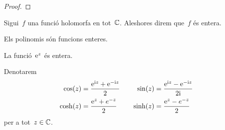 \documentclass[../Apunts.tex]{subfiles}
\begin{document}
	\begin{proof}
%		
	\end{proof}
	\begin{definition}
		\label{def:funció entera}
		Sigui~\(f\) una funció holomorfa en tot~\(\mathbb{C}\). Aleshores direm que~\(f\) és entera.
	\end{definition}
	\begin{example}
		Els polinomis són funcions enteres.
	\end{example}
	\begin{example}
		La funció~\(\mathrm{e}^{z}\) és entera.
	\end{example}
	\begin{notation}
		Denotarem
		\begin{gather*}
			\begin{split}
				\cos(z)&=\frac{\mathrm{e}^{\mathrm{i} z}+\mathrm{e}^{-\mathrm{i} z}}{2} \\
				\cosh(z)&=\frac{\mathrm{e}^{z}+e^{-z}}{2}
			\end{split}\qquad
			\begin{split}
				\sin(z)&=\frac{\mathrm{e}^{\mathrm{i} z}-\mathrm{e}^{-\mathrm{i} z}}{2\mathrm{i}} \\
				\sinh(z)&=\frac{\mathrm{e}^{z}-e^{-z}}{2}
			\end{split} \\
		\end{gather*}
		per a tot~\(z\in\mathbb{C}\).
	\end{notation}
\end{document}
